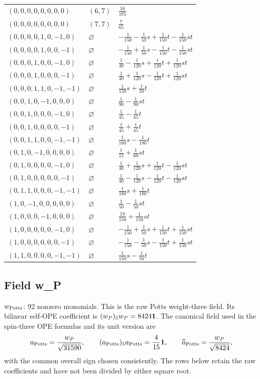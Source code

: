 \begin{longtable}{@{}lll@{}}
$(0,0,0,0,0,0,0,0)$ & $(6,7)$ & $\frac{16}{195}$\\
$(0,0,0,0,0,0,0,0)$ & $(7,7)$ & $\frac{7}{65}$\\
$(0,0,0,0,1,0,-1,0)$ & $\varnothing$ & $-\frac{1}{150}-\frac{1}{50}s+\frac{1}{150}t-\frac{1}{150}st$\\
$(0,0,0,0,1,0,0,-1)$ & $\varnothing$ & $-\frac{1}{150}+\frac{1}{50}s-\frac{1}{150}t-\frac{1}{150}st$\\
$(0,0,0,1,0,0,-1,0)$ & $\varnothing$ & $\frac{1}{40}-\frac{1}{120}s+\frac{1}{120}t+\frac{1}{120}st$\\
$(0,0,0,1,0,0,0,-1)$ & $\varnothing$ & $\frac{1}{40}+\frac{1}{120}s-\frac{1}{120}t+\frac{1}{120}st$\\
$(0,0,0,1,1,0,-1,-1)$ & $\varnothing$ & $\frac{1}{150}s+\frac{1}{50}t$\\
$(0,0,1,0,-1,0,0,0)$ & $\varnothing$ & $\frac{1}{90}-\frac{1}{90}st$\\
$(0,0,1,0,0,0,-1,0)$ & $\varnothing$ & $\frac{1}{45}-\frac{1}{45}t$\\
$(0,0,1,0,0,0,0,-1)$ & $\varnothing$ & $\frac{1}{45}+\frac{1}{45}t$\\
$(0,0,1,1,0,0,-1,-1)$ & $\varnothing$ & $\frac{1}{180}s-\frac{1}{180}t$\\
$(0,1,0,-1,0,0,0,0)$ & $\varnothing$ & $\frac{1}{12}+\frac{1}{60}st$\\
$(0,1,0,0,0,0,-1,0)$ & $\varnothing$ & $\frac{1}{40}+\frac{1}{120}s+\frac{1}{120}t-\frac{1}{120}st$\\
$(0,1,0,0,0,0,0,-1)$ & $\varnothing$ & $\frac{1}{40}-\frac{1}{120}s-\frac{1}{120}t-\frac{1}{120}st$\\
$(0,1,1,0,0,0,-1,-1)$ & $\varnothing$ & $\frac{1}{180}s+\frac{1}{180}t$\\
$(1,0,-1,0,0,0,0,0)$ & $\varnothing$ & $\frac{1}{50}-\frac{1}{50}st$\\
$(1,0,0,0,-1,0,0,0)$ & $\varnothing$ & $\frac{19}{150}+\frac{1}{150}st$\\
$(1,0,0,0,0,0,-1,0)$ & $\varnothing$ & $-\frac{1}{150}+\frac{1}{50}s+\frac{1}{150}t+\frac{1}{150}st$\\
$(1,0,0,0,0,0,0,-1)$ & $\varnothing$ & $-\frac{1}{150}-\frac{1}{50}s-\frac{1}{150}t+\frac{1}{150}st$\\
$(1,1,0,0,0,0,-1,-1)$ & $\varnothing$ & $\frac{1}{150}s-\frac{1}{50}t$\\
\end{longtable}
\endgroup

\subsection{Field w\_P}
$w_{\rm Potts}$: 92 nonzero monomials.
This is the raw Potts weight-three field. Its bilinear
self-OPE coefficient is $(w_P)_5w_P=8424\mathbf1$. The canonical field
used in the spin-three OPE formulas and its unit version are
\[
a_{\rm Potts}=\frac{w_P}{\sqrt{31590}},\qquad
(a_{\rm Potts})_5a_{\rm Potts}=\frac4{15}\mathbf1,\qquad
\widehat a_{\rm Potts}=\frac{w_P}{\sqrt{8424}},
\]
with the common overall sign chosen consistently. The rows below retain
the raw coefficients and have not been divided by either square root.

